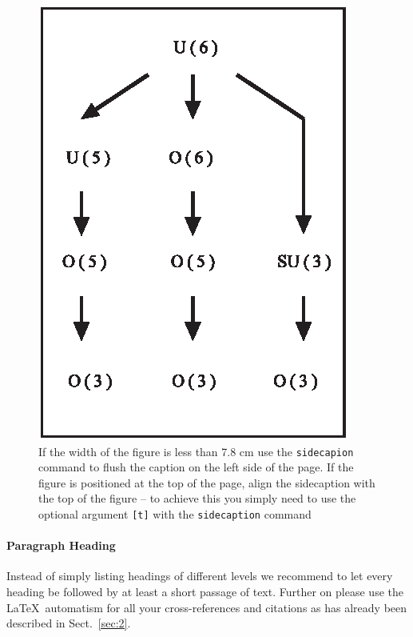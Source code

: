\documentclass[graybox]{svmult}
\begin{document}
%
\begin{figure}[b]
\sidecaption
\includegraphics[scale=.65]{figure}
%
%
\caption{If the width of the figure is less than 7.8 cm use the \texttt{sidecapion} command to flush the caption on the left side of the page. If the figure is positioned at the top of the page, align the sidecaption with the top of the figure -- to achieve this you simply need to use the optional argument \texttt{[t]} with the \texttt{sidecaption} command}
\label{fig:1}       %
\end{figure}


\paragraph{Paragraph Heading} %
Instead of simply listing headings of different levels we recommend to
let every heading be followed by at least a short passage of text.
Further on please use the \LaTeX\ automatism for all your
cross-references and citations as has already been described in
Sect.~\ref{sec:2}.
\end{document}
